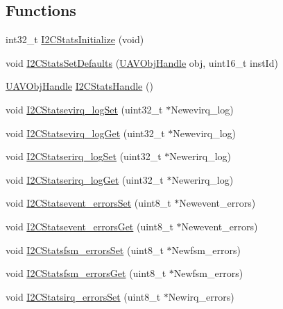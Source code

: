 \subsection*{\-Functions}
\begin{DoxyCompactItemize}
\item 
int32\-\_\-t \hyperlink{group___i2_c_stats_ga5a3ce31d5bd4ac53406837a330e09c6f}{\-I2\-C\-Stats\-Initialize} (void)
\item 
void \hyperlink{group___i2_c_stats_ga89a35c023aea76ad0899856531e3f832}{\-I2\-C\-Stats\-Set\-Defaults} (\hyperlink{targets_2_u_a_v_objects_2inc_2uavobjectmanager_8h_a279053e22be53ce9f895043aaeb91e3b}{\-U\-A\-V\-Obj\-Handle} obj, uint16\-\_\-t inst\-Id)
\item 
\hyperlink{targets_2_u_a_v_objects_2inc_2uavobjectmanager_8h_a279053e22be53ce9f895043aaeb91e3b}{\-U\-A\-V\-Obj\-Handle} \hyperlink{group___i2_c_stats_ga2fa9f5dad816a87207b2ee4759bd1613}{\-I2\-C\-Stats\-Handle} ()
\item 
void \hyperlink{group___i2_c_stats_ga41651bca6807acc212a3e528962676dc}{\-I2\-C\-Statsevirq\-\_\-log\-Set} (uint32\-\_\-t $\ast$\-Newevirq\-\_\-log)
\item 
void \hyperlink{group___i2_c_stats_ga9ff75216185c7a2ceef6e00f1073fc3c}{\-I2\-C\-Statsevirq\-\_\-log\-Get} (uint32\-\_\-t $\ast$\-Newevirq\-\_\-log)
\item 
void \hyperlink{group___i2_c_stats_gadcfb41af596d2ae6d34bfaba74f69a6a}{\-I2\-C\-Statserirq\-\_\-log\-Set} (uint32\-\_\-t $\ast$\-Newerirq\-\_\-log)
\item 
void \hyperlink{group___i2_c_stats_ga82079324bd34824b23e5faf93bd1ef81}{\-I2\-C\-Statserirq\-\_\-log\-Get} (uint32\-\_\-t $\ast$\-Newerirq\-\_\-log)
\item 
void \hyperlink{group___i2_c_stats_gae5a65ef7231b9bce6b17e0ce3228817f}{\-I2\-C\-Statsevent\-\_\-errors\-Set} (uint8\-\_\-t $\ast$\-Newevent\-\_\-errors)
\item 
void \hyperlink{group___i2_c_stats_ga68ba19bfe3289155f3311d70b7c06a15}{\-I2\-C\-Statsevent\-\_\-errors\-Get} (uint8\-\_\-t $\ast$\-Newevent\-\_\-errors)
\item 
void \hyperlink{group___i2_c_stats_ga8cfbb76b9b7cd65764d2a4ef321e2aca}{\-I2\-C\-Statsfsm\-\_\-errors\-Set} (uint8\-\_\-t $\ast$\-Newfsm\-\_\-errors)
\item 
void \hyperlink{group___i2_c_stats_ga0df3861cf6336e208c7f67deac9b4d69}{\-I2\-C\-Statsfsm\-\_\-errors\-Get} (uint8\-\_\-t $\ast$\-Newfsm\-\_\-errors)
\item 
void \hyperlink{group___i2_c_stats_ga3351148b9b3be4e118b4d6baeac0df80}{\-I2\-C\-Statsirq\-\_\-errors\-Set} (uint8\-\_\-t $\ast$\-Newirq\-\_\-errors)

\end{DoxyCompactItemize}

